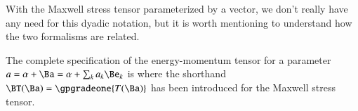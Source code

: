 With the Maxwell stress tensor parameterized by a vector, we don't really have any need for this dyadic notation, but it is worth mentioning to
understand how the two formalisms are related.

The complete specification of the energy-momentum tensor for a parameter \( a = \alpha + \Ba = \alpha + \sum_k a_k \Be_k \) is
where the shorthand \( \BT(\Ba) = \gpgradeone{T(\Ba)} \) has been introduced for the Maxwell stress tensor.
